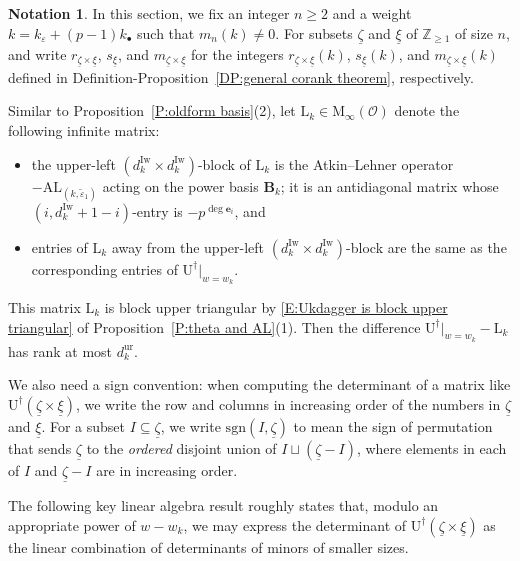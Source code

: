 \documentclass[12pt]{amsart}
\theoremstyle{definition}
\newtheorem{notation}[subsection]{Notation}
\numberwithin{equation}{subsection}
\def\calO{\mathcal{O}}
\def\bfB{\mathbf{B}}
\def\ZZ{\mathbb{Z}}
\def\bfe{\mathbf{e}}
\def\rmL{\mathrm{L}}
\def\rmM{\mathrm{M}}
\def\rmU{\mathrm{U}}
\newcommand{\AL}{\mathrm{AL}}
\newcommand{\Iw}{\mathrm{Iw}}
\newcommand{\sgn}{\mathrm{sgn}}
\newcommand{\ur}{\mathrm{ur}}
\begin{document}
\begin{notation}
\label{N:T = U-L}In this section, we fix an integer $n \geq 2$ and a weight $k= k_\varepsilon +(p-1)k_\bullet$ such that $m_n(k) \neq 0$.
For subsets $\underline \zeta$ and $\underline \xi$ of $\ZZ_{\geq 1}$ of size $n$, and write  $r_{\underline \zeta\times \underline \xi}$,  $s_{\underline \xi}$, and $m_{\underline \zeta\times \underline \xi}$ for the integers $r_{\underline \zeta\times \underline \xi}(k)$, $s_{\underline \xi}(k)$, and $m_{\underline \zeta\times \underline \xi}(k)$ defined in Definition-Proposition~\ref{DP:general corank theorem}, respectively.





Similar to Proposition~\ref{P:oldform basis}(2), let $\rmL_k \in  \rmM_{\infty}(\calO)$ denote the following infinite matrix:
\begin{itemize}
\item the upper-left $(d_k^\Iw \times d_k^\Iw)$-block of $\rmL_k$ is the Atkin--Lehner operator $-\AL_{(k, \tilde \varepsilon_1)}$ acting on the power basis $\bfB_k$;  it is an antidiagonal matrix whose $(i, d_k^\Iw+1-i)$-entry is $-p^{\deg \bfe_i}$, and 
\item entries of $\rmL_k$ away from the upper-left $(d_k^\Iw \times d_k^\Iw)$-block are the same as the corresponding entries of $\rmU^\dagger|_{w=w_k}$.
\end{itemize}
This matrix $\rmL_k$ is block upper triangular by \eqref{E:Ukdagger is block upper triangular} of Proposition~\ref{P:theta and AL}(1).
Then the difference $\rmU^\dagger|_{w=w_k} - \rmL_k$ has rank at most $d_k^\ur$.

We also need a sign convention: when computing the determinant of a matrix like $\rmU^\dagger(\underline \zeta\times \underline \xi)$, we write the row and columns in increasing order of the numbers in $\underline \zeta$ and $\underline \xi$. For a subset $I \subseteq \underline \zeta$, we write $\sgn(I, \underline \zeta)$ to mean the sign of permutation that sends $\underline \zeta$ to the \emph{ordered} disjoint union of $I \sqcup (\underline \zeta -I)$, where elements in each of $I$ and $\underline \zeta-I$ are in increasing order.

\end{notation}


The following key linear algebra result roughly states that, modulo an appropriate power of $w-w_k$, we may express the determinant of $\rmU^\dagger(\underline \zeta \times \underline \xi)$ as the linear combination of determinants of minors of smaller sizes. 
\end{document}
